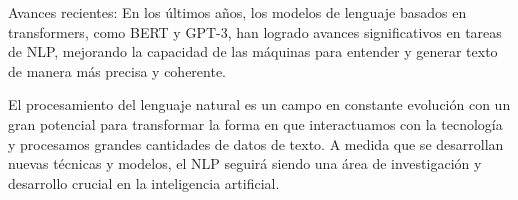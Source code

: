 Avances recientes: En los últimos años, los modelos de lenguaje basados en transformers, como BERT y GPT-3, han logrado avances significativos en tareas de NLP, mejorando la capacidad de las máquinas para entender y generar texto de manera más precisa y coherente.

El procesamiento del lenguaje natural es un campo en constante evolución con un gran potencial para transformar la forma en que interactuamos con la tecnología y procesamos grandes cantidades de datos de texto. A medida que se desarrollan nuevas técnicas y modelos, el NLP seguirá siendo una área de investigación y desarrollo crucial en la inteligencia artificial.



